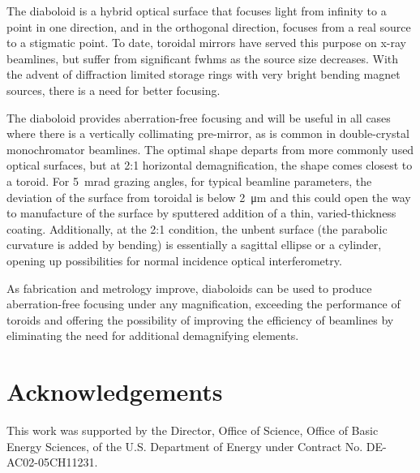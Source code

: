 \documentclass{iucr}       %
\begin{document}
The diaboloid is a hybrid optical surface that focuses light from infinity to a point in one direction, and in the orthogonal direction, focuses from a real source to a stigmatic point. To date, toroidal mirrors have served this purpose on x-ray beamlines, but suffer from significant fwhms as the source size decreases. With the advent of diffraction limited storage rings with very bright bending magnet sources, there is a need for better focusing. 

The diaboloid provides aberration-free focusing and will be useful in all cases where there is a vertically collimating pre-mirror, as is common in double-crystal monochromator beamlines. The optimal shape departs from more commonly used optical surfaces, but at 2:1 horizontal demagnification, the shape comes closest to a toroid.
For \SI{5}{\milli\radian} grazing angles, for typical beamline parameters, the deviation of the surface from toroidal is below \SI{2}{\micro\meter} and this could open the way to manufacture of the surface by sputtered addition of a thin, varied-thickness coating. Additionally, at the 2:1 condition, the unbent surface (the parabolic curvature is added by bending) is essentially a sagittal ellipse or a cylinder, opening up possibilities for normal incidence optical interferometry.

As fabrication and metrology improve, diaboloids can be used to produce aberration-free focusing under any magnification, exceeding the performance of toroids and offering the possibility of improving the efficiency of beamlines by eliminating the need for additional demagnifying elements. 




\vspace{5mm}
\section{Acknowledgements}    
 
 
This work was supported by the Director, Office of Science, Office of Basic Energy Sciences, of the U.S. Department of Energy under Contract No. DE-AC02-05CH11231.
\end{document}
